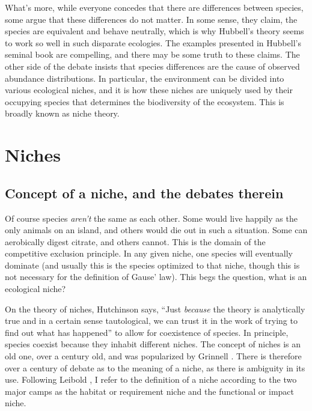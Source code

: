\documentclass[a4paper,11pt]{article}
\numberwithin{equation}{section} %
\begin{document}
What's more, while everyone concedes that there are differences between species, some argue that these differences do not matter. 
In some sense, they claim, the species are equivalent and behave neutrally, which is why Hubbell's theory seems to work so well in such disparate ecologies. 
The examples presented in Hubbell's seminal book are compelling, and there may be some truth to these claims. 
The other side of the debate insists that species differences are the cause of observed abundance distributions. 
In particular, the environment can be divided into various ecological niches, and it is how these niches are uniquely used by their occupying species that determines the biodiversity of the ecosystem. 
This is broadly known as niche theory. 




\section{Niches}
\subsection{Concept of a niche, and the debates therein}
Of course species \emph{aren't} the same as each other. 
Some would live happily as the only animals on an island, and others would die out in such a situation. 
Some can aerobically digest citrate, and others cannot. 
This is the domain of the competitive exclusion principle. In any given niche, one species will eventually dominate (and usually this is the species optimized to that niche, though this is not necessary for the definition of Gause' law). 
This begs the question, what is an ecological niche? 

On the theory of niches, Hutchinson \cite{Hutchinson1957} says, ``Just \emph{because} the theory is analytically true and in a certain sense tautological, we can trust it in the work of trying to find out what has happened'' to allow for coexistence of species. 
In principle, species coexist because they inhabit different niches. 
The concept of niches is an old one, over a century old, and was popularized by Grinnell \cite{Grinnell1917}. 
There is therefore over a century of debate as to the meaning of a niche, as there is ambiguity in its use. 
Following Leibold \cite{Leibold1995}, I refer to the definition of a niche according to the two major camps as the habitat or requirement niche and the functional or impact niche. 
\end{document}
